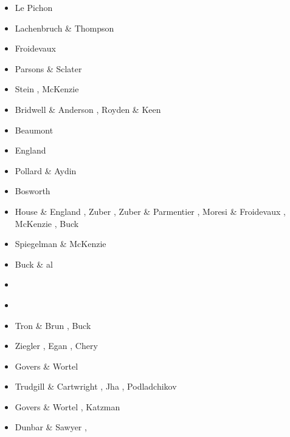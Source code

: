 \begin{scriptsize}
\begin{itemize}
\item[\nineteensixtyeight] Le Pichon \cite{lepi68}
\item[\nineteenseventytwo] Lachenbruch \& Thompson \cite{lath72}
\item[\nineteenseventythree] Froidevaux \cite{froi73}
\item[\nineteenseventyseven] Parsons \& Sclater \cite{pasc77}
\item[\nineteenseventyeight] Stein \cite{stei78}, McKenzie \cite{mcke78}
\item[\nineteeneighty] Bridwell \& Anderson \cite{bran80}, Royden \& Keen \cite{roke80}
\item[\nineteeneightytwo] Beaumont \etal \cite{bekb82}
\item[\nineteeneightythree] England \cite{engl83}
\item[\nineteeneightyfour] Pollard \& Aydin \cite{poay84}
\item[\nineteeneightyfive] Bosworth \cite{bosw85}
\item[\nineteeneightysix] House \& England \cite{hoen86b}, Zuber \etal \cite{zupf86}, 
                          Zuber \& Parmentier \cite{zupa86}, Moresi \& Froidevaux \cite{mofr86},
                          McKenzie \cite{mcke86}, Buck \cite{buck86}
\item[\nineteeneightyseven] Spiegelman \& McKenzie \cite{spmc87}
\item[\nineteeneightyeight] Buck \& al \cite{bums88}
\item[\nineteeneightynine] \cite{mewi89}\cite{brbe89}\cite{ismb89}\cite{soen89}\cite{brbe89b}\cite{brbe89c}
\item[\nineteenninety] \cite{fara90}\cite{lipa90}\cite{mccl90}\cite{chmo90}\cite{chmo90b}
\item[\nineteenninetyone] Tron \& Brun \cite{trbr91}, Buck \cite{buck91}
\item[\nineteenninetytwo] Ziegler \cite{zieg92b}, Egan \cite{egan92}, Chery \etal \cite{chld92}
\item[\nineteenninetythree] Govers \& Wortel \cite{gowo93}
\item[\nineteenninetyfour] Trudgill \& Cartwright \cite{trca94}, Jha \etal \cite{jhpp94},
                           Podladchikov \etal \cite{popy94}
\item[\nineteenninetyfive] Govers \& Wortel \cite{gowo95}, Katzman \etal \cite{katl95}
\item[\nineteenninetysix] Dunbar \& Sawyer \cite{dusa96}, \cite{beda96}\cite{mada96}

\end{itemize}
\end{scriptsize}
